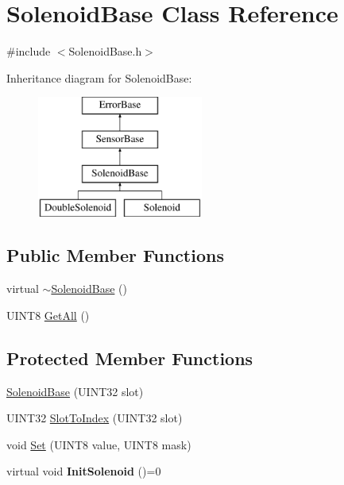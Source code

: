 \hypertarget{classSolenoidBase}{\section{\-Solenoid\-Base \-Class \-Reference}
\label{classSolenoidBase}
}


{\ttfamily \#include $<$\-Solenoid\-Base.\-h$>$}

\-Inheritance diagram for \-Solenoid\-Base\-:\begin{figure}[H]
\begin{center}
\leavevmode
\includegraphics[height=4.000000cm]{classSolenoidBase}
\end{center}
\end{figure}
\subsection*{\-Public \-Member \-Functions}
\begin{DoxyCompactItemize}
\item 
virtual \hyperlink{classSolenoidBase_aa3ff4e46bc52588243bfb6ea511864fa}{$\sim$\-Solenoid\-Base} ()
\item 
\-U\-I\-N\-T8 \hyperlink{classSolenoidBase_ac0d9d4d811fce90140eef64f41cecdd5}{\-Get\-All} ()
\end{DoxyCompactItemize}
\subsection*{\-Protected \-Member \-Functions}
\begin{DoxyCompactItemize}
\item 
\hyperlink{classSolenoidBase_a1ba5489c438cb364c4f97dd86e3d6533}{\-Solenoid\-Base} (\-U\-I\-N\-T32 slot)
\item 
\-U\-I\-N\-T32 \hyperlink{classSolenoidBase_a279a4e4d5ef5973208fd468ab17efdba}{\-Slot\-To\-Index} (\-U\-I\-N\-T32 slot)
\item 
void \hyperlink{classSolenoidBase_a7aa6f30b9b7337867667f24fec115058}{\-Set} (\-U\-I\-N\-T8 value, \-U\-I\-N\-T8 mask)
\item 
\hypertarget{classSolenoidBase_a7ca79c91469bd82dc13163c3c7144d5e}{virtual void {\bfseries \-Init\-Solenoid} ()=0}\label{classSolenoidBase_a7ca79c91469bd82dc13163c3c7144d5e}

\end{DoxyCompactItemize}
